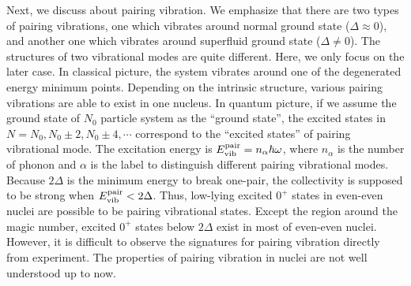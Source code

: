 \documentclass[11pt]{book} %
\begin{document}
Next, we discuss about pairing vibration. We emphasize that there are two types of pairing vibrations, one which vibrates around normal ground state ($\Delta\approx 0$), and another one which vibrates around superfluid ground state ($\Delta\neq 0$). The structures of two vibrational modes are quite different. 
Here, we only focus on the later case.
In classical picture, the system vibrates around one of the degenerated energy minimum points. Depending on the intrinsic structure, various pairing vibrations are able to exist in one nucleus. 
In quantum picture, if we assume the ground state of $N_0$ particle system as the ``ground state'', the excited states in $N=N_0, N_0\pm2, N_0\pm4,\cdots$ correspond to the ``excited states'' of pairing vibrational mode. The excitation energy is $E_{\rm vib}^{\rm pair}=n_{\alpha}\hbar\omega$, where $n_{\alpha}$ is the number of phonon and $\alpha$ is the label to distinguish different pairing vibrational modes. Because $2\Delta$ is the minimum energy to break one-pair, the collectivity is supposed to be strong when $E_{\rm vib}^{\rm pair}<2\Delta$. Thus, low-lying excited $0^+$ states in even-even nuclei are possible to be pairing vibrational states. Except the region around the magic number, excited $0^+$ states below $2\Delta$ exist in most of even-even nuclei. However, it is difficult to observe the signatures for pairing vibration directly from experiment. The properties of pairing vibration in nuclei are not well understood up to now.
\end{document}
